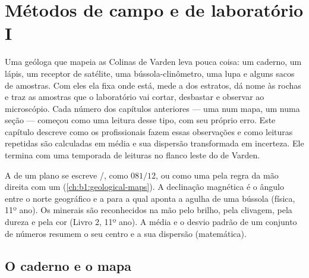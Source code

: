 \chapter{Métodos de campo e de laboratório I}\label{ch:b1:field-lab-methods-1}

Uma geóloga que mapeia as Colinas de Varden leva pouca coisa: um caderno, um lápis, um receptor de satélite, uma bússola-clinômetro, uma lupa e alguns sacos de amostras. Com eles ela fixa onde está, mede a  dos estratos, dá nome às rochas e traz as amostras que o laboratório vai cortar, desbastar e observar ao microscópio. Cada número dos capítulos anteriores --- uma  num mapa, um  numa seção --- começou como uma leitura desse tipo, com seu próprio erro. Este capítulo descreve como os profissionais fazem essas observações e como leituras repetidas são calculadas em média e sua dispersão transformada em incerteza. Ele termina com uma temporada de leituras no flanco leste do  de Varden.

\begin{recall}
A  de um plano se escreve /, como $081/12$, ou como uma  pela regra da mão direita com um  (\cref{ch:b1:geological-maps}). A declinação magnética é o ângulo entre o norte geográfico e a  para a qual aponta a agulha de uma bússola (física, 11º ano). Os minerais são reconhecidos na mão pelo brilho, pela clivagem, pela dureza e pela cor (Livro 2, 11º ano). A média e o desvio padrão de um conjunto de números resumem o seu centro e a sua dispersão (matemática).
\end{recall}

\section{O caderno e o mapa}

